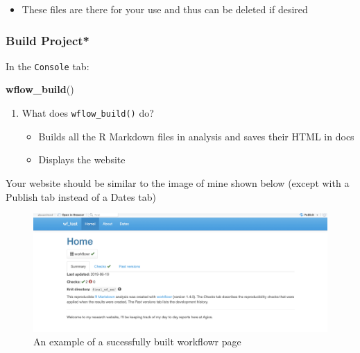 \documentclass[openany]{book}
\newenvironment{Shaded}{\begin{snugshade}}{\end{snugshade}}
\newcommand{\KeywordTok}[1]{\textcolor[rgb]{0.13,0.29,0.53}{\textbf{#1}}}
\newcommand{\NormalTok}[1]{#1}
\providecommand{\tightlist}{%
  \setlength{\itemsep}{0pt}\setlength{\parskip}{0pt}}
\begin{document}
\begin{enumerate}
  \begin{itemize}
  \tightlist
  \item
    These files are there for your use and thus can be deleted if desired
  \end{itemize}
\end{enumerate}

\hypertarget{build-project}{%
\subsubsection{Build Project*}\label{build-project}}

In the \texttt{Console} tab:

\begin{Shaded}
\begin{Highlighting}[]
\KeywordTok{wflow_build}\NormalTok{()}
\end{Highlighting}
\end{Shaded}

\begin{enumerate}
\def\labelenumi{\arabic{enumi}.}
\tightlist
\item
  What does \texttt{wflow\_build()} do?

  \begin{itemize}
  \tightlist
  \item
    Builds all the R Markdown files in analysis and saves their HTML in docs
  \item
    Displays the website
  \end{itemize}
\end{enumerate}

Your website should be similar to the image of mine shown below (except with a Publish tab instead of a Dates tab)

\begin{figure}

{\centering \includegraphics[width=0.9\linewidth]{images/Workflow_Photos/sample_wf} 

}

\caption{An example of a sucessfully built workflowr page}\label{fig:c4}
\end{figure}
\end{document}

